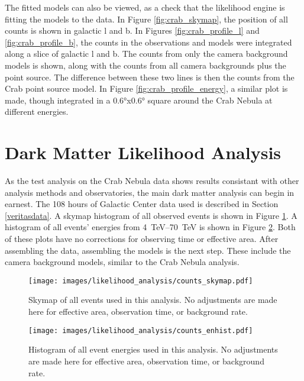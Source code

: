  The fitted models can also be viewed, as a check that the likelihood engine is fitting the models to the data.
  In Figure \ref{fig:crab_skymap}, the position of all counts is shown in galactic l and b.
  In Figures \ref{fig:crab_profile_l} and \ref{fig:crab_profile_b}, the counts in the observations and models were integrated along a slice of galactic l and b.
  The counts from only the camera background models is shown, along with the counts from all camera backgrounds plus the point source.
  The difference between these two lines is then the counts from the Crab point source model.
  In Figure \ref{fig:crab_profile_energy}, a similar plot is made, though integrated in a \ang{0.6}x\ang{0.6} square around the Crab Nebula at different energies.

  \FloatBarrier

\section{Dark Matter Likelihood Analysis}
  
  As the test analysis on the Crab Nebula data shows results consistant with other analysis methods and observatories, the main dark matter analysis can begin in earnest.
  The 108 hours of Galactic Center data used is described in Section \ref{veritasdata}.
  A skymap histogram of all observed events is shown in Figure \ref{fig:gc_counts_skymap}.
  A histogram of all events' energies from \SIrange{4}{70}{TeV} is shown in Figure \ref{fig:gc_counts_enhist}.
  Both of these plots have no corrections for observing time or effective area.
  After assembling the data, assembling the models is the next step.
  These include the camera background models, similar to the Crab Nebula analysis.
  
  \begin{figure}[ht]
    \centering
    \texttt{[image: images/likelihood\_analysis/counts\_skymap.pdf]}
    \caption[Galactic Center Counts Skymap]{
      Skymap of all events used in this analysis.
      No adjustments are made here for effective area, observation time, or background rate.
    }
    \label{fig:gc_counts_skymap}
  \end{figure}
  
  \begin{figure}[h]
    \centering
    \texttt{[image: images/likelihood\_analysis/counts\_enhist.pdf]}
    \caption[Galactic Center Counts Energy Histogram]{
      Histogram of all event energies used in this analysis.
      No adjustments are made here for effective area, observation time, or background rate.
    }
    \label{fig:gc_counts_enhist}
  \end{figure}

